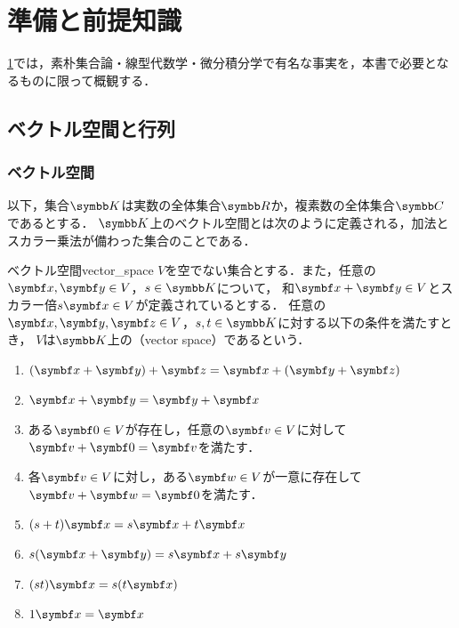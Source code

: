 \documentclass[../../main]{subfiles}
\begin{document}
\chapter{準備と前提知識}
\label{chapter:preliminary}

\begin{lead}
  \cref{chapter:preliminary}では，素朴集合論・線型代数学・微分積分学で有名な事実を，本書で必要となるものに限って概観する．
\end{lead}

\section{ベクトル空間と行列}

\subsection{ベクトル空間}

以下，集合\(\numset{K}\)は実数の全体集合\(\numset{R}\)か，複素数の全体集合\(\numset{C}\)であるとする．
\(\numset{K}\)上のベクトル空間とは次のように定義される，加法とスカラー乗法が備わった集合のことである．

\begin{definition}{ベクトル空間}{vector_space}
  \(V\)を空でない集合とする．また，任意の\(\vect{x},\vect{y}\in V\)，\(s\in\numset{K}\)について，
  和\(\vect{x}+\vect{y}\in V\)とスカラー倍\(s\vect{x}\in V\)が定義されているとする．
  任意の\(\vect{x},\vect{y},\vect{z}\in V\)，\(s,t\in\numset{K}\)に対する以下の条件を満たすとき，
  \(V\)は\(\numset{K}\)上の（vector space）であるという．

  \begin{enumerate}
    \item \((\vect{x}+\vect{y})+\vect{z}=\vect{x}+(\vect{y}+\vect{z})\)
    \item \(\vect{x}+\vect{y}=\vect{y}+\vect{x}\)
    \item ある\(\zvec\in V\)が存在し，任意の\(\vect{v}\in V\)に対して\(\vect{v}+\zvec=\vect{v}\)を満たす．
    \item 各\(\vect{v}\in V\)に対し，ある\(\vect{w}\in V\)が一意に存在して\(\vect{v}+\vect{w}=\zvec\)を満たす．
    \item \((s+t)\vect{x}=s\vect{x}+t\vect{x}\)
    \item \(s(\vect{x}+\vect{y})=s\vect{x}+s\vect{y}\)
    \item \((st)\vect{x}=s(t\vect{x})\)
    \item \(1\vect{x}=\vect{x}\)
  \end{enumerate}
\end{definition}
\end{document}
